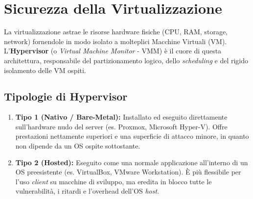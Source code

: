 \section{Sicurezza della Virtualizzazione}
La virtualizzazione astrae le risorse hardware fisiche (CPU, RAM, storage, network) fornendole in modo isolato a molteplici Macchine Virtuali (VM). L'\textbf{Hypervisor} (o \textit{Virtual Machine Monitor} - VMM) è il cuore di questa architettura, responsabile del partizionamento logico, dello \textit{scheduling} e del rigido isolamento delle VM ospiti.

\subsection{Tipologie di Hypervisor}
\begin{enumerate}
    \item \textbf{Tipo 1 (Nativo / Bare-Metal):} Installato ed eseguito direttamente sull'hardware nudo del server (es. Proxmox, Microsoft Hyper-V). Offre prestazioni nettamente superiori e una superficie di attacco minore, in quanto non dipende da un OS ospite sottostante.
    \item \textbf{Tipo 2 (Hosted):} Eseguito come una normale applicazione all'interno di un OS preesistente (es. VirtualBox, VMware Workstation). È più flessibile per l'uso \textit{client} su macchine di sviluppo, ma eredita in blocco tutte le vulnerabilità, i ritardi e l'overhead dell'OS \textit{host}.
\end{enumerate}

\begin{center}
\end{center}

